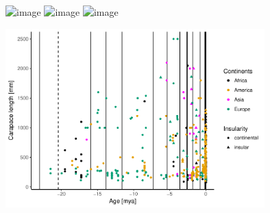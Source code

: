 \begin{frame}

\begin{center}
	\includegraphics<1>[width=0.75\textwidth]{pics/evolution1.png}
	\includegraphics<2>[width=0.75\textwidth]{pics/evolution2.png}
	\includegraphics<3>[width=0.75\textwidth]{pics/evolution3.png}
\end{center}

\end{frame}

\begin{frame}
\begin{center}
\includegraphics[width=0.75\textwidth]{MA_JJ_files/figure-latex/overviewData-1.pdf}
\end{center}

\end{frame}